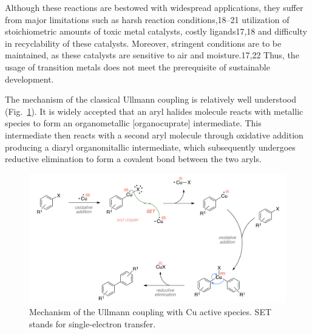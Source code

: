 \documentclass[%
 reprint,
 amsmath,amssymb,
 aps,
prb,
]{revtex4-2}
\begin{document}
Although these reactions are bestowed with widespread applications, they suffer from major limitations such as harsh reaction conditions,18–21 utilization of stoichiometric amounts of toxic metal catalysts, costly ligands17,18 and difficulty in recyclability of these catalysts. Moreover, stringent conditions are to be maintained, as these catalysts are sensitive to air and moisture.17,22 Thus, the usage of transition metals does not meet the prerequisite of sustainable development.

The mechanism of the classical Ullmann coupling is relatively well understood (Fig.~\ref{fig:classical}).
It is widely accepted that an aryl halides molecule reacts with metallic species to form an organometallic [organocuprate] intermediate. This intermediate then reacts with a second aryl molecule through oxidative addition producing a diaryl organomitallic intermediate, which subsequently undergoes reductive elimination to form a covalent bond between the two aryls. 

\begin{figure}[htb]
\centering
\includegraphics[width=1.0\columnwidth]{Fig/classical-mechanism.png}
\caption{Mechanism of the Ullmann coupling with Cu active species. SET stands for single-electron transfer. %
}
\label{fig:classical}
\end{figure}
\end{document}
